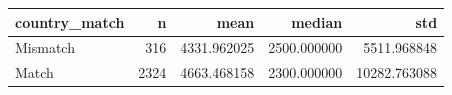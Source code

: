 \begin{tabular}{lrrrr}
\toprule
country\_match & n & mean & median & std \\
\midrule
Mismatch & 316 & 4331.962025 & 2500.000000 & 5511.968848 \\
Match & 2324 & 4663.468158 & 2300.000000 & 10282.763088 \\
\bottomrule
\end{tabular}
